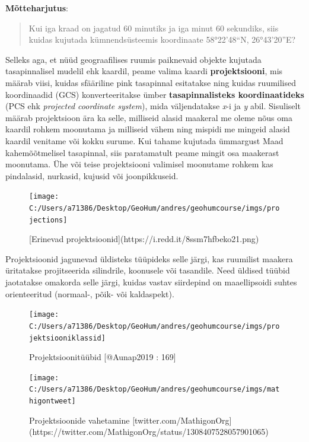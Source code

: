 \documentclass[
]{book}
\begin{document}
\textbf{Mõtteharjutus}:

\begin{quote}
Kui iga kraad on jagatud 60 minutiks ja iga minut 60 sekundiks, siis kuidas kujutada kümnendsüsteemis koordinaate 58°22'48``N, 26°43'20''E?
\end{quote}

Selleks aga, et nüüd geograafilises ruumis paiknevaid objekte kujutada tasapinnalisel mudelil ehk kaardil, peame valima kaardi \textbf{projektsiooni}, mis määrab viisi, kuidas sfääriline pink tasapinnal esitatakse ning kuidas ruumilised koordinaadid (GCS) konverteeritakse ümber \textbf{tasapinnalisteks koordinaatideks} (PCS ehk \emph{projected coordinate system}), mida väljendatakse \emph{x}-i ja \emph{y} abil. Sisuliselt määrab projektsioon ära ka selle, milliseid alasid maakeral me oleme nõus oma kaardil rohkem moonutama ja milliseid vähem ning mispidi me mingeid alasid kaardil venitame või kokku surume. Kui tahame kujutada ümmargust Maad kahemõõtmelisel tasapinnal, siis paratamatult peame mingit osa maakerast moonutama. Ühe või teise projektsiooni valimisel moonutame rohkem kas pindalasid, nurkasid, kujusid või joonpikkuseid.

\begin{figure}

{\centering \texttt{[image: C:/Users/a71386/Desktop/GeoHum/andres/geohumcourse/imgs/projections]} 

}

\caption{[Erinevad projektsioonid](https://i.redd.it/8ssm7hfbeko21.png)}\label{fig:projections}
\end{figure}

Projektsioonid jagunevad üldisteks tüüpideks selle järgi, kas ruumilist maakera üritatakse projitseerida silindrile, koonusele või tasandile. Need üldised tüübid jaotatakse omakorda selle järgi, kuidas vastav siirdepind on maaellipsoidi suhtes orienteeritud (normaal-, põik- või kaldaspekt).

\begin{figure}

{\centering \texttt{[image: C:/Users/a71386/Desktop/GeoHum/andres/geohumcourse/imgs/projektsiooniklassid]} 

}

\caption{Projektsioonitüübid [@Aunap2019 : 169]}\label{fig:projektsioonipered}
\end{figure}

\begin{figure}

{\centering \texttt{[image: C:/Users/a71386/Desktop/GeoHum/andres/geohumcourse/imgs/mathigontweet]} 

}

\caption{Projektsioonide vahetamine [twitter.com/MathigonOrg](https://twitter.com/MathigonOrg/status/1308407528057901065)}\label{fig:mathigontweet}
\end{figure}
\end{document}
